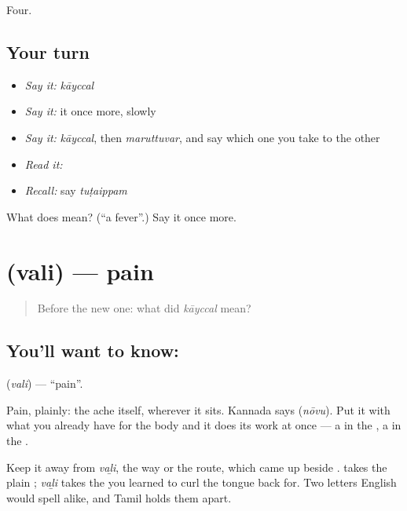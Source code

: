 \begin{grammarlens}[title={What you've built}]
Four.
\end{grammarlens}

\subsection*{Your turn}
\begin{itemize}
\raggedright
  \item \emph{Say it:} \emph{kāyccal}
  \item \emph{Say it:} it once more, slowly
  \item \emph{Say it:} \emph{kāyccal}, then \emph{maruttuvar}, and say which one you take to the other
  \item \emph{Read it:} \textbf{}
  \item \emph{Recall:} say \emph{tuṭaippam}
\end{itemize}

\begin{tcolorbox}[breakable,colback=teal!4,colframe=teal!35!black,title={Before you move on}]
What does  mean? (\textquotedblleft{}a fever\textquotedblright{}.) Say it once more.
\end{tcolorbox}
\section[\texorpdfstring{\ta{வலி} (vali)}{வலி (vali)}]{ (vali) — pain}

\label{lesson:TA-C61-pain}



\begin{quote}
Before the new one: what did \emph{kāyccal} mean?
\end{quote}

\subsection*{You'll want to know: }
\textbf{} (\emph{vali}) — \textquotedblleft{}pain\textquotedblright{}.

Pain, plainly: the ache itself, wherever it sits. Kannada says  (\emph{nōvu}). Put it with what you already have for the body and it does its work at once — a  in the , a  in the .

Keep it away from \emph{vaḻi}, the way or the route, which came up beside .  takes the plain ; \emph{vaḻi} takes the  you learned to curl the tongue back for. Two letters English would spell alike, and Tamil holds them apart.

